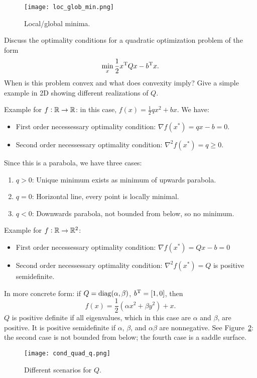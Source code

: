 \documentclass{article}
\begin{document}
\begin{figure}[H]
  \centering
  \texttt{[image: loc\_glob\_min.png]}
  \caption{Local/global minima.\label{fig:min}}
\end{figure}

\begin{question}
  Discuss the optimality conditions for a quadratic optimization problem of the form
  \begin{equation*}
    \min_x \frac{1}{2} x^{\mathrm{T}} Q x - b^{\mathrm{T}} x.
  \end{equation*}
  When is this problem convex and what does convexity imply? Give a simple example in 2D showing
  different realizations of \(Q\).
\end{question}

Example for \(f: \mathbb{R} \to \mathbb{R}\): in this case, \(f(x) = \frac{1}{2}qx^2 + bx\). We have:
\begin{itemize}
\item First order necessessary optimality condition: \(\nabla f(x^*) = qx - b = 0\).
\item Second order necessessary optimality condition: \(\nabla^2 f(x^*) = q \geq 0\).
\end{itemize}
Since this is a parabola, we have three cases:
\begin{enumerate}
\item \(q > 0\): Unique minimum exists as minimum of upwards parabola.
\item \(q = 0\): Horizontal line, every point is locally minimal.
\item \(q < 0\): Downwards parabola, not bounded from below, so no minimum.
\end{enumerate}

Example for \(f: \mathbb{R} \to \mathbb{R}^2\):
\begin{itemize}
\item First order necessessary optimality condition: \(\nabla f(x^*) = Qx - b = 0\)
\item Second order necessessary optimality condition: \(\nabla^2 f(x^*) = Q\) is positive
  semidefinite.	
\end{itemize}
In more concrete form: if \(Q = \operatorname{diag}(\alpha, \beta)\), \(b^{\mathrm{T}} = [1, 0]\), then
\begin{equation*}
  f(x) = \frac{1}{2} (\alpha x^2 + \beta y^2) + x.
\end{equation*}
\(Q\) is positive definite if all eigenvalues, which in this case are \(\alpha\) and \(\beta\), are
positive.  It is positive semidefinite if \(\alpha\), \(\beta\), and \(\alpha\beta\) are
nonnegative.  See Figure~\ref{fig:cond_quad}: the second case is not bounded from below; the fourth
case is a saddle surface.
\begin{figure}[H]
  \centering
  \texttt{[image: cond\_quad\_q.png]}
  \caption{Different scenarios for \(Q\).\label{fig:cond_quad}}
\end{figure}
\end{document}
